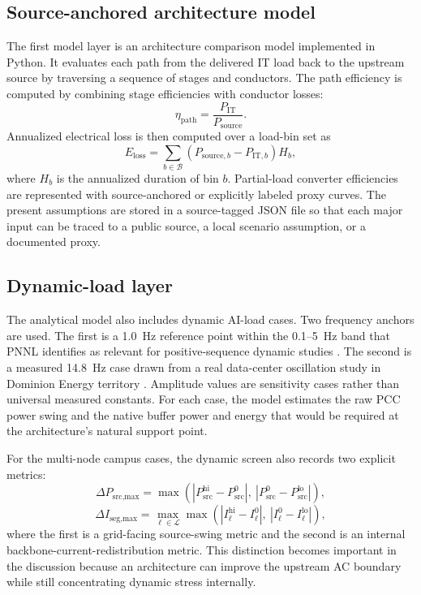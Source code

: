 \documentclass[11pt]{article}
\begin{document}
\subsection{Source-anchored architecture model}
The first model layer is an architecture comparison model implemented in Python. It evaluates each path from the delivered IT load back to the upstream source by traversing a sequence of stages and conductors. The path efficiency is computed by combining stage efficiencies with conductor losses:
\begin{equation}
\eta_{\text{path}} = \frac{P_{\text{IT}}}{P_{\text{source}}}.
\end{equation}
Annualized electrical loss is then computed over a load-bin set as
\begin{equation}
E_{\text{loss}} = \sum_{b \in \mathcal{B}} \left(P_{\text{source},b} - P_{\text{IT},b}\right) H_b,
\end{equation}
where $H_b$ is the annualized duration of bin $b$. Partial-load converter efficiencies are represented with source-anchored or explicitly labeled proxy curves. The present assumptions are stored in a source-tagged JSON file so that each major input can be traced to a public source, a local scenario assumption, or a documented proxy.

\subsection{Dynamic-load layer}
The analytical model also includes dynamic AI-load cases. Two frequency anchors are used. The first is a 1.0~Hz reference point within the 0.1--5~Hz band that PNNL identifies as relevant for positive-sequence dynamic studies \cite{PNNL2026EMT}. The second is a measured 14.8~Hz case drawn from a real data-center oscillation study in Dominion Energy territory \cite{Mishra2025Oscillation}. Amplitude values are sensitivity cases rather than universal measured constants. For each case, the model estimates the raw PCC power swing and the native buffer power and energy that would be required at the architecture's natural support point.

For the multi-node campus cases, the dynamic screen also records two explicit metrics:
\begin{equation}
\Delta P_{\text{src,max}} = \max \left( \left|P_{\text{src}}^{\text{hi}} - P_{\text{src}}^{0}\right|,\ \left|P_{\text{src}}^{0} - P_{\text{src}}^{\text{lo}}\right| \right),
\end{equation}
\begin{equation}
\Delta I_{\text{seg,max}} = \max_{\ell \in \mathcal{L}} \max \left( \left|I_{\ell}^{\text{hi}} - I_{\ell}^{0}\right|,\ \left|I_{\ell}^{0} - I_{\ell}^{\text{lo}}\right| \right),
\end{equation}
where the first is a grid-facing source-swing metric and the second is an internal backbone-current-redistribution metric. This distinction becomes important in the discussion because an architecture can improve the upstream AC boundary while still concentrating dynamic stress internally.
\end{document}
